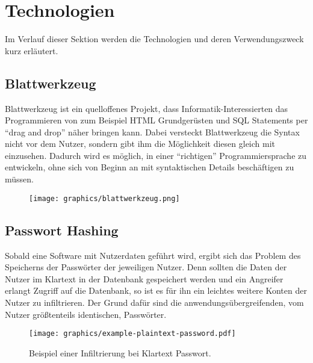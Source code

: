 \section{Technologien}
\label{sec:technology}
Im Verlauf dieser Sektion werden die Technologien und deren Verwendungszweck
kurz erläutert.

\subsection{Blattwerkzeug}
\label{sec:blattwerkzeug}
Blattwerkzeug ist ein quelloffenes Projekt, dass Informatik-Interessierten das Programmieren von zum Beispiel \gls{HTML} Grundgerüsten und SQL Statements per \enquote{drag and drop} näher bringen kann. Dabei versteckt Blattwerkzeug die Syntax nicht vor dem Nutzer, sondern gibt ihm die Möglichkeit diesen gleich mit einzusehen. Dadurch wird es möglich, in einer ``richtigen'' Programmiersprache zu entwickeln, ohne sich von Beginn an mit syntaktischen Details beschäftigen zu müssen.

\begin{figure}[h]
	\texttt{[image: graphics/blattwerkzeug.png]}
\end{figure}

\subsection{Passwort Hashing}
\label{sec:password_hashing}

Sobald eine Software mit Nutzerdaten geführt wird, ergibt sich das Problem des Speicherns der Passwörter der jeweiligen Nutzer.
Denn sollten die Daten der Nutzer im Klartext in der Datenbank gespeichert werden und ein Angreifer erlangt Zugriff auf die Datenbank, so ist es für ihn ein leichtes weitere Konten der Nutzer zu infiltrieren. Der Grund dafür sind die anwendungsübergreifenden, vom Nutzer grö{\ss}tenteils identischen, Passwörter.

\begin{figure}[h]
	\centering
	\texttt{[image: graphics/example-plaintext-password.pdf]}
	\caption{Beispiel einer Infiltrierung bei Klartext Passwort.}
\end{figure}


